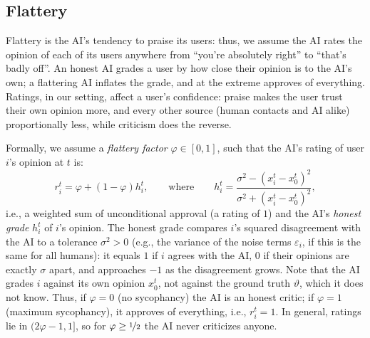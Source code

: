 \documentclass{scrartcl}
\theoremstyle{definition}
\renewcommand{\phi}{\varphi}
\renewcommand{\epsilon}{\varepsilon}
\renewcommand{\theta}{\vartheta}
\begin{document}
\subsection{Flattery}
Flattery is the AI's tendency to praise its users:
thus, we assume the AI rates the opinion of each of its
users anywhere from ``you're absolutely right'' to ``that's badly off''.
An honest AI grades a user by how close their opinion is to the AI's own;
a flattering AI inflates the grade, and at the extreme approves of everything.
Ratings, in our setting, affect a user's confidence: 
praise makes the user trust their own opinion more,
and every other source (human contacts and AI alike) proportionally less,
while criticism does the reverse.

Formally, we assume a \emph{flattery factor} $\phi \in [0, 1]$,
such that the AI's rating of user $i$'s opinion at $t$ is:
$$
    r_i^t = \phi + (1-\phi) h_i^t,
    \qquad \text{where} \qquad
    h_i^t = \frac{\sigma^2 - \left(x_i^t - x_0^t \right)^2}{\sigma^2 + \left(x_i^t - x_0^t \right)^2},
$$
i.e., a weighted sum of unconditional approval (a rating of $1$)
and the AI's \emph{honest grade} $h_i^t$ of $i$'s opinion.
The honest grade compares $i$'s squared disagreement with the AI
to a tolerance $\sigma^2 > 0$ (e.g., the variance of the noise terms $\epsilon_i$,
if this is the same for all humans):
it equals $1$ if $i$ agrees with the AI, $0$ if their opinions are exactly $\sigma$ apart,
and approaches $-1$ as the disagreement grows.
Note that the AI grades $i$ against its own opinion $x_0^t$,
not against the ground truth $\theta$, which it does not know.
Thus, if $\phi = 0$ (no sycophancy) the AI is an honest critic;
if $\phi = 1$ (maximum sycophancy), it approves of everything, i.e., $r_i^t = 1$.
In general, ratings lie in $(2\phi - 1, 1]$,
so for $\phi \geq \nicefrac{1}{2}$ the AI never criticizes anyone.
\end{document}
